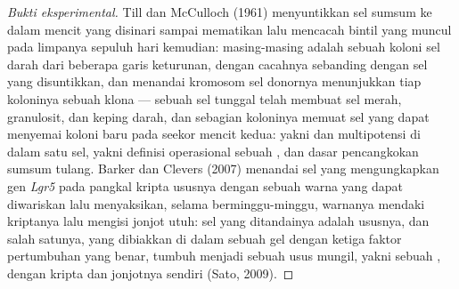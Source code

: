 \begin{proof}[Bukti eksperimental]
Till dan McCulloch (1961) menyuntikkan sel sumsum ke dalam mencit yang
disinari sampai mematikan lalu mencacah bintil yang muncul pada limpanya
sepuluh hari kemudian: masing-masing adalah sebuah koloni sel darah dari beberapa garis keturunan,
dengan cacahnya sebanding dengan sel yang disuntikkan, dan menandai kromosom sel
donornya menunjukkan tiap koloninya sebuah klona --- sebuah sel
tunggal telah membuat sel merah, granulosit, dan keping darah, dan sebagian koloninya
memuat sel yang dapat menyemai koloni baru pada seekor mencit kedua:
yakni  dan multipotensi di dalam satu sel, yakni definisi operasional
sebuah , dan dasar pencangkokan sumsum tulang. Barker dan
Clevers (2007) menandai sel yang mengungkapkan gen \emph{Lgr5} pada pangkal
kripta ususnya dengan sebuah warna yang dapat diwariskan lalu menyaksikan, selama berminggu-minggu,
warnanya mendaki kriptanya lalu mengisi jonjot utuh: sel yang ditandainya adalah
 ususnya, dan salah satunya, yang dibiakkan di dalam sebuah gel dengan
ketiga faktor pertumbuhan yang benar, tumbuh menjadi sebuah usus mungil, yakni sebuah
\emph{}, dengan kripta dan jonjotnya sendiri (Sato, 2009).
\end{proof}

